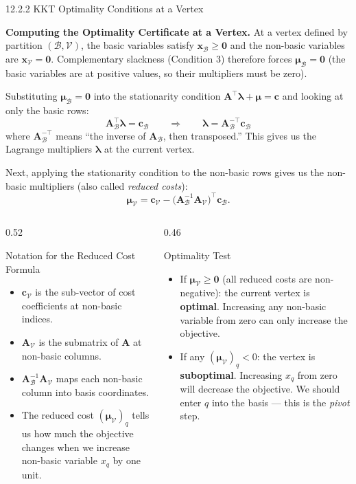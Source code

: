 \documentclass[aspectratio=169,10pt]{beamer}
\newcommand{\xv}{\mathbf{x}}
\newcommand{\cv}{\mathbf{c}}
\newcommand{\Av}{\mathbf{A}}
\newcommand{\muv}{\boldsymbol{\mu}}
\newcommand{\lav}{\boldsymbol{\lambda}}
\newcommand{\calB}{\mathcal{B}}
\newcommand{\calV}{\mathcal{V}}
\begin{document}
\begin{frame}[allowframebreaks]{12.2.2 KKT Optimality Conditions at a Vertex}
\framebreak

\textbf{Computing the Optimality Certificate at a Vertex.}
At a vertex defined by partition $(\calB, \calV)$, the basic variables satisfy
$\xv_\calB \ge \mathbf{0}$ and the non-basic variables are $\xv_\calV = \mathbf{0}$.
Complementary slackness (Condition 3) therefore forces $\muv_\calB = \mathbf{0}$
(the basic variables are at positive values, so their multipliers must be zero).

Substituting $\muv_\calB = \mathbf{0}$ into the stationarity condition
$\Av^\top\lav + \muv = \cv$ and looking at only the basic rows:
\[
  \Av_\calB^\top\lav = \cv_\calB
  \qquad\Rightarrow\qquad
  \lav = \Av_\calB^{-\top}\cv_\calB
\]
where $\Av_\calB^{-\top}$ means ``the inverse of $\Av_\calB$, then transposed.''
This gives us the Lagrange multipliers $\lav$ at the current vertex.

Next, applying the stationarity condition to the non-basic rows gives us the
non-basic multipliers (also called \emph{reduced costs}):
\[
  \muv_\calV = \cv_\calV - \bigl(\Av_\calB^{-1}\Av_\calV\bigr)^\top\cv_\calB.
\]

\begin{columns}
  \begin{column}{0.52\textwidth}
    \begin{block}{Notation for the Reduced Cost Formula}
    \begin{itemize}
      \item $\cv_\calV$ is the sub-vector of cost coefficients at non-basic indices.
      \item $\Av_\calV$ is the submatrix of $\Av$ at non-basic columns.
      \item $\Av_\calB^{-1}\Av_\calV$ maps each non-basic column into basis
            coordinates.
      \item The reduced cost $(\muv_\calV)_q$ tells us how much the objective
            changes when we increase non-basic variable $x_q$ by one unit.
    \end{itemize}
    \end{block}
  \end{column}
  \begin{column}{0.46\textwidth}
    \begin{alertblock}{Optimality Test}
      \begin{itemize}
        \item If $\muv_\calV \ge \mathbf{0}$ (all reduced costs are non-negative):
              the current vertex is \textbf{optimal}.  Increasing any non-basic
              variable from zero can only increase the objective.
        \item If any $(\muv_\calV)_q < 0$: the vertex is \textbf{suboptimal}.
              Increasing $x_q$ from zero will decrease the objective.
              We should enter $q$ into the basis --- this is the \emph{pivot} step.
      \end{itemize}
    \end{alertblock}
  \end{column}
\end{columns}

\end{frame}
\end{document}
